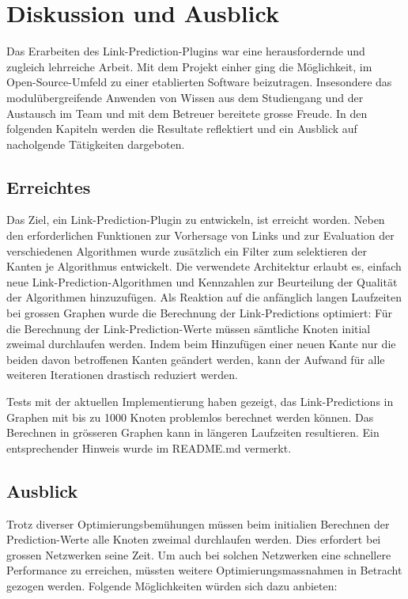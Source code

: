 \chapter{Diskussion und Ausblick}

Das Erarbeiten des Link-Prediction-Plugins war eine herausfordernde und zugleich lehrreiche Arbeit.
Mit dem Projekt einher ging die Möglichkeit, im Open-Source-Umfeld zu einer etablierten Software beizutragen.
Insesondere das modulübergreifende Anwenden von Wissen aus dem Studiengang und der Austausch im Team und mit dem Betreuer bereitete grosse Freude.
In den folgenden Kapiteln werden die Resultate reflektiert und ein Ausblick auf nacholgende Tätigkeiten dargeboten.

\section{Erreichtes}

Das Ziel, ein Link-Prediction-Plugin zu entwickeln, ist erreicht worden.
Neben den erforderlichen Funktionen zur Vorhersage von Links und zur Evaluation der verschiedenen Algorithmen wurde zusätzlich ein Filter zum selektieren der Kanten je Algorithmus entwickelt.
Die verwendete Architektur erlaubt es, einfach neue Link-Prediction-Algorithmen und Kennzahlen zur Beurteilung der Qualität der Algorithmen hinzuzufügen.
Als Reaktion auf die anfänglich langen Laufzeiten bei grossen Graphen wurde die Berechnung der Link-Predictions optimiert:
Für die Berechnung der Link-Prediction-Werte müssen sämtliche Knoten initial zweimal durchlaufen werden.
Indem beim Hinzufügen einer neuen Kante nur die beiden davon betroffenen Kanten geändert werden, kann der Aufwand für alle weiteren Iterationen drastisch reduziert werden.

Tests mit der aktuellen Implementierung haben gezeigt, das Link-Predictions in Graphen mit bis zu 1000 Knoten problemlos berechnet werden können.
Das Berechnen in grösseren Graphen kann in längeren Laufzeiten resultieren.
Ein entsprechender Hinweis wurde im README.md vermerkt.

\section{Ausblick}

Trotz diverser Optimierungsbemühungen müssen beim initialien Berechnen der Prediction-Werte alle Knoten zweimal durchlaufen werden.
Dies erfordert bei grossen Netzwerken seine Zeit.
Um auch bei solchen Netzwerken eine schnellere Performance zu erreichen, müssten weitere Optimierungsmassnahmen in Betracht gezogen werden.
Folgende Möglichkeiten würden sich dazu anbieten:

